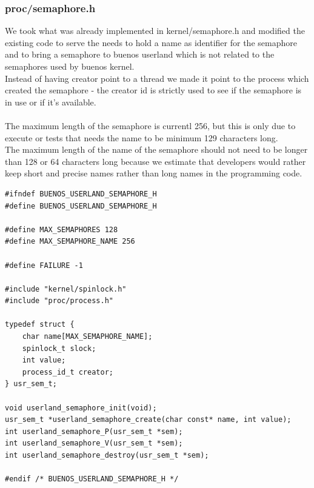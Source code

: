 \documentclass[a4paper,12pt,danish]{report}
\begin{document}
\subsubsection{proc/semaphore.h}
We took what was already implemented in kernel/semaphore.h and modified the existing code to serve the needs to hold a name as identifier for the semaphore and to bring a semaphore to buenos userland which is not related to the semaphores used by buenos kernel.
\\
Instead of having creator point to a thread we made it point to the process which created the semaphore - the creator id is strictly used to see if the semaphore is in use or if it's available.
\\
\\
The maximum length of the semaphore is currentl 256, but this is only due to execute or tests that needs the name to be minimum 129 characters long.
\\
The maximum length of the name of the semaphore should not need to be longer than 128 or 64 characters long because we estimate that developers would rather keep short and precise names rather than long names in the programming code.
\begin{verbatim}
#ifndef BUENOS_USERLAND_SEMAPHORE_H
#define BUENOS_USERLAND_SEMAPHORE_H

#define MAX_SEMAPHORES 128
#define MAX_SEMAPHORE_NAME 256

#define FAILURE -1

#include "kernel/spinlock.h"
#include "proc/process.h"

typedef struct {
    char name[MAX_SEMAPHORE_NAME];
    spinlock_t slock;
    int value;
    process_id_t creator;
} usr_sem_t;

void userland_semaphore_init(void);
usr_sem_t *userland_semaphore_create(char const* name, int value);
int userland_semaphore_P(usr_sem_t *sem);
int userland_semaphore_V(usr_sem_t *sem);
int userland_semaphore_destroy(usr_sem_t *sem);

#endif /* BUENOS_USERLAND_SEMAPHORE_H */
\end{verbatim}
\end{document}
